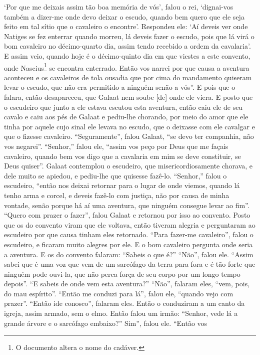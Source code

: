 `Por que me deixais assim tão boa memória de vós’, falou o rei, ‘dignai-vos
também a dizer-me onde devo deixar o escudo, quando bem quero que ele seja
feito em tal sítio que o cavaleiro o encontre’. Respondeu ele: ‘Aí deveis ver
onde Natiges se fez enterrar quando morreu, lá deveis fazer o escudo, pois que
lá virá o bom cavaleiro no décimo-quarto dia, assim tendo recebido a ordem da
cavalaria’. E assim veio, quando hoje é o décimo-quinto dia em que viestes a
este convento, onde Nascius\footnote{ O documento altera o
nome do cadáver.}  se encontra enterrado. Então vos narrei por que
causa a aventura aconteceu e os cavaleiros de tola ousadia que por cima do
mandamento quiseram levar o escudo, que não era permitido a ninguém senão a
vós”. E pois que o falara, então desapareceu, que Galaat nem
soube [de] onde ele viera. E posto que o escudeiro que junto a ele estava escutou
esta aventura, então caiu ele de seu cavalo e caiu aos pés de Galaat e
pediu-lhe chorando, por meio do amor que ele tinha por aquele cujo sinal ele
levava no escudo, que o deixasse com ele cavalgar e que o fizesse cavaleiro.
“Seguramente”, falou Galaat, “se devo ter companhia, não vos negarei”.
“Senhor,” falou ele, “assim vos peço por Deus que me façais cavaleiro, quando
bem vos digo que a cavalaria em mim se deve constituir, se Deus quiser”. Galaat
contemplou o escudeiro, que misericordiosamente chorava, e dele muito se
apiedou, e pediu-lhe que quisesse fazê-lo. “Senhor,” falou o escudeiro, “então
nos deixai retornar para o lugar de onde viemos, quando lá tenho arma e corcel,
e deveis fazê-lo com justiça, não por causa de minha vontade, senão porque há
aí uma aventura, que ninguém consegue levar ao fim”. “Quero com prazer o
fazer”, falou Galaat e retornou por isso ao convento. Posto que os do convento
viram que ele voltava, então tiveram alegria e perguntaram ao escudeiro por que
causa tinham eles retornado. “Para fazer-me cavaleiro”, falou o escudeiro, e
ficaram muito alegres por ele. E o bom cavaleiro pergunta onde seria a
aventura. E os do convento falaram: “Sabeis o que é?” “Não”, falou ele. “Assim
sabei que é uma voz que vem de um sarcófago da terra para fora e é tão forte
que ninguém pode ouvi-la, que não perca força de seu corpo por um longo tempo
depois”. “E sabeis de onde vem esta aventura?” “Não”, falaram eles, “vem,
pois, do mau espírito”. “Então me conduzi para lá”, falou ele, “quando vejo com
prazer”. “Então ide conosco”, falaram eles. Então o conduziram a um canto da
igreja, assim armado, sem o elmo. Então falou um irmão: “Senhor, vede lá a
grande árvore e o sarcófago embaixo?” Sim”,  falou ele. “Então vos

